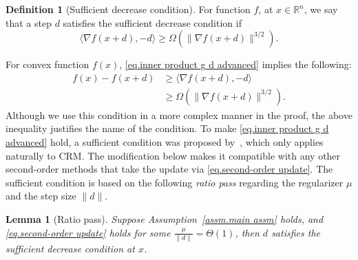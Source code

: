 \documentclass{article}
\theoremstyle{plain}
\newtheorem{lemma}[theorem]{Lemma}
\theoremstyle{definition}
\newtheorem{definition}[theorem]{Definition}
\theoremstyle{remark}
\begin{document}
\begin{definition}[Sufficient decrease condition]
    \label{def.sufficient decrease condition}
    For function $f$, at $x\in\mathbb{R}^n$, we say that a step $d$ satisfies the sufficient decrease condition if
    \begin{equation}
        \label{eq.inner product g d advanced}
        \langle \nabla f(x+d),-d \rangle \geq \Omega\left(\|\nabla f(x+d)\|^{3/2}\right).
    \end{equation}
\end{definition}
For convex function $f(x)$, \eqref{eq.inner product g d advanced} implies the following:
\begin{equation*}
    \begin{aligned}
        f(x)-f(x+d) & \geq \langle \nabla f(x+d),-d \rangle            \\
                    & \geq \Omega\left(\|\nabla f(x+d)\|^{3/2}\right).
    \end{aligned}
\end{equation*}
Although we use this condition in a more complex manner in the proof, the above inequality justifies the name of the condition. To make \eqref{eq.inner product g d advanced} hold, a sufficient condition was proposed by~\citet[Lemma 6]{nesterov2008accelerating}, which only applies naturally to CRM. The modification below makes it compatible with any other second-order methods that take the update via \eqref{eq.second-order update}. The sufficient condition is based on the following \emph{ratio pass} regarding the regularizer $\mu$ and the step size $\|d\|$.
\begin{lemma}[Ratio pass]
    \label{lem.ratiopass}
    Suppose Assumption~\ref{assm.main assm} holds, and \eqref{eq.second-order update} holds for some $\tfrac{\mu}{\|d\|} = \Theta(1)$, then $d$ satisfies the sufficient decrease condition at $x$.
\end{lemma}
\end{document}
